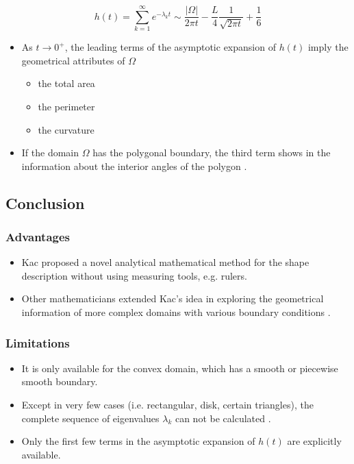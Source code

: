        \begin{equation}\label{eq:kac_result}
          h(t) = \sum_{k=1}^{\infty} e^{-\lambda_kt} \sim \frac{|\Omega|}{2\pi t} - \frac{L}{4} \frac{1}{\sqrt{2\pi t}} + \frac{1}{6}
       \end{equation}
     
      \begin{itemize} 
        \item As $t \rightarrow 0^{+}$, the leading terms of the asymptotic expansion of $h(t)$ imply the geometrical attributes of $\Omega$
          \begin{itemize}
            \item the total area
            \item the perimeter
            \item the curvature
          \end{itemize}
          
        \item If the domain $\Omega$ has the polygonal boundary, the third term shows in the information about the interior angles of the polygon \cite{grieser2013hearing}.
      \end{itemize}



    \subsection{Conclusion}

     \subsubsection{Advantages}

        \begin{itemize}
          \item Kac proposed a novel analytical mathematical method for the shape description without using measuring tools, e.g. rulers.
          \item Other mathematicians extended Kac's idea in exploring the geometrical information of more complex domains with various boundary conditions \cite{khabou2007shape}\cite{gottlieb1985eigenvalues}\cite{gottlieb1983hearing} \cite{zayed1989heat}\cite{sleeman1984trace}.
        \end{itemize}
        
     \subsubsection{Limitations}
        
        \begin{itemize}
          \item It is only available for the convex domain, which has a smooth or piecewise smooth boundary.  
          \item Except in very few cases (i.e. rectangular, disk, certain triangles), the complete sequence of eigenvalues $\lambda_k$ can not be calculated \cite{grieser2013hearing}.
          \item Only the first few terms in the asymptotic expansion of $h(t)$ are explicitly available.
        \end{itemize}
